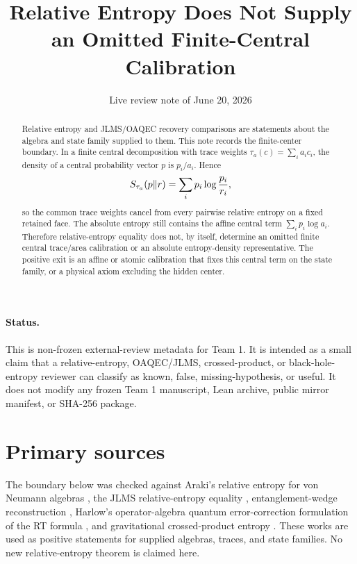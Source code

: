 \documentclass[12pt]{article}
\title{Relative Entropy Does Not Supply\\
an Omitted Finite-Central Calibration}
\author{}
\date{Live review note of June 20, 2026}
\theoremstyle{remark}
\begin{document}
\maketitle

\begin{abstract}
Relative entropy and JLMS/OAQEC recovery comparisons are statements about the
algebra and state family supplied to them.  This note records the finite-center
boundary.  In a finite central decomposition with trace weights
\(\tau_a(c)=\sum_i a_i c_i\), the density of a central probability vector
\(p\) is \(p_i/a_i\).  Hence
\[
  S_{\tau_a}(p\Vert r)
  =
  \sum_i p_i\log{p_i\over r_i},
\]
so the common trace weights cancel from every pairwise relative entropy on a
fixed retained face.  The absolute entropy still contains the affine central
term \(\sum_i p_i\log a_i\).  Therefore relative-entropy equality does not, by
itself, determine an omitted finite central trace/area calibration or an
absolute entropy-density representative.  The positive exit is an affine or
atomic calibration that fixes this central term on the state family, or a
physical axiom excluding the hidden center.
\end{abstract}

\paragraph{Status.}
This is non-frozen external-review metadata for Team 1.  It is intended as a
small claim that a relative-entropy, OAQEC/JLMS, crossed-product, or
black-hole-entropy reviewer can classify as known, false, missing-hypothesis,
or useful.  It does not modify any frozen Team 1 manuscript, Lean archive,
public mirror manifest, or SHA-256 package.

\section{Primary sources}

The boundary below was checked against Araki's relative entropy for von
Neumann algebras \cite{ArakiRelativeEntropy}, the JLMS relative-entropy
equality \cite{JLMS}, entanglement-wedge reconstruction
\cite{DongHarlowWall}, Harlow's operator-algebra quantum error-correction
formulation of the RT formula \cite{HarlowRTQEC}, and gravitational
crossed-product entropy \cite{WittenCrossed,CPWLargeN}.  These works are used
as positive statements for supplied algebras, traces, and state families.  No
new relative-entropy theorem is claimed here.
\end{document}
